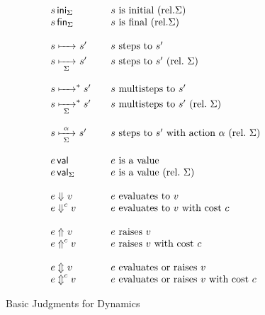 \documentclass[11pt]{article}
\begin{document}
\begin{figure}[p]
    \begin{displaymath}
        \begin{array}{l@{\qquad}l}
            \isIni[\Sigma]{s}            & s\ \text{is initial}\ (\text{rel.} \Sigma) \\
            \isFin[\Sigma]{s}            & s\ \text{is final}\ (\text{rel.} \Sigma) \\\\
            s\stepsTo s'         & s\ \text{steps to}\ s' \\
            s\stepsTo[\Sigma] s' & s\ \text{steps to}\ s'\ (\text{rel.}\ \Sigma)\\\\
            s\stepsTo(\ast) s' & s\ \text{multisteps to}\ s' \\
            s\stepsTo[\Sigma](\ast) s' & s\ \text{multisteps to}\ s'\ (\text{rel.}\ \Sigma) \\\\
            s\stepsTo[\Sigma]<\alpha> s' & s\ \text{steps to}\ s'\ \text{with action}\ \alpha\ (\text{rel.}\ \Sigma) \\\\
            \isVal{e}            &  e\ \text{is a value} \\
            \isVal[\Sigma]{e}    & e\ \text{is a value}\ (\text{rel.}\ \Sigma) \\\\
            e\evalsToJ v          & e\ \text{evaluates to}\ v \\
            e\evalsToJ(c) v       & e\ \text{evaluates to}\ v\ \text{with cost}\ c \\\\
            e\raisesJ v           & e\ \text{raises}\ v \\
            e\raisesJ(c) v        & e\ \text{raises}\ v\ \text{with cost}\ c \\\\
            e\evalsorraisesJ v    & e\ \text{evaluates or raises}\ v \\
            e\evalsorraisesJ(c) v    & e\ \text{evaluates or raises}\ v\ \text{with cost}\ c
        \end{array}
    \end{displaymath}

    \caption{Basic Judgments for Dynamics}
    \label{fig:dynamics}
\end{figure}
\end{document}
